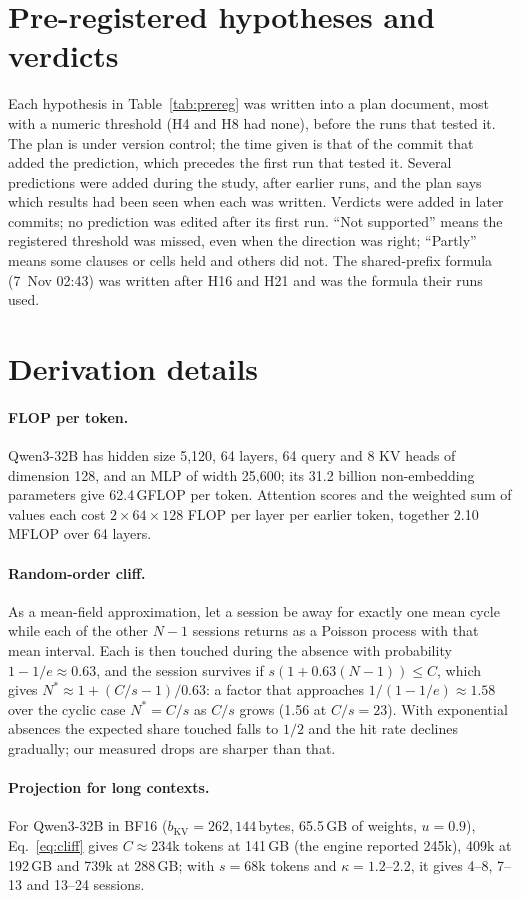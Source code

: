 \section{Pre-registered hypotheses and verdicts}
\label{app:prereg}

Each hypothesis in Table~\ref{tab:prereg} was written into a plan document, most with a numeric threshold (H4 and H8 had none), before the runs that tested it.
The plan is under version control; the time given is that of the commit that added the prediction, which precedes the
first run that tested it. Several predictions were added during the study, after earlier runs, and the plan says which
results had been seen when each was written. Verdicts were added in later commits; no prediction was edited after its first run.
``Not supported'' means the registered threshold was missed, even when the direction was right; ``Partly'' means
some clauses or cells held and others did not. The shared-prefix formula (7~Nov 02:43) was written after H16
and H21 and was the formula their runs used.




\section{Derivation details}
\label{app:derive}

\paragraph{FLOP per token.} Qwen3-32B has hidden size 5,120, 64 layers, 64 query and 8 KV heads of dimension 128, and an
MLP of width 25,600; its 31.2 billion non-embedding parameters give 62.4\,GFLOP per token. Attention scores and the
weighted sum of values each cost $2\times64\times128$ FLOP per layer per earlier token, together 2.10\,MFLOP over 64 layers.

\paragraph{Random-order cliff.} As a mean-field approximation, let a session be away for exactly one mean cycle while
each of the other $N-1$ sessions returns as a Poisson process with that mean interval. Each is then touched during the
absence with probability $1-1/e\approx0.63$, and the session survives if $s(1 + 0.63(N-1)) \le C$, which gives
$N^\ast \approx 1 + (C/s-1)/0.63$: a factor that approaches $1/(1-1/e)\approx1.58$ over the cyclic case $N^\ast=C/s$ as
$C/s$ grows (1.56 at $C/s=23$). With exponential absences the expected share touched falls to $1/2$
and the hit rate declines gradually; our measured drops are sharper than that.

\paragraph{Projection for long contexts.} For Qwen3-32B in BF16 ($b_{\text{KV}}=262{,}144$\,bytes, 65.5\,GB of weights,
$u=0.9$), Eq.~\eqref{eq:cliff} gives $C\approx234$k tokens at 141\,GB (the engine reported 245k), 409k at 192\,GB and
739k at 288\,GB; with $s=68$k tokens and $\kappa=1.2$--2.2, it gives 4--8, 7--13 and 13--24 sessions.
